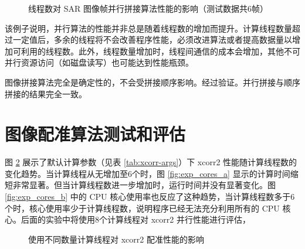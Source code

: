 \begin{figure}[htbp]
\centering
\subfloat[程序计算时间]{
    \label{fig:exp_merge_a}
    \begin{minipage}[t]{0.49\textwidth}
        \centering
        \resizebox {\textwidth} {!} {
            
        }
    \end{minipage}
}
\caption{线程数对 SAR 图像帧并行拼接算法性能的影响（测试数据共6帧）} \label{fig:exp_merge}
\end{figure}
 
该例子说明，并行算法的性能并非总是随着线程数的增加而提升。计算线程数量超过一定值后，多余的线程将不会改善程序性能，必须改进算法或者提高数据量以增加可利用的线程数。此外，线程数量增加时，线程间通信的成本会增加，其他不可并行资源访问（如磁盘读写）也可能达到性能瓶颈。

图像拼接算法完全是确定性的，不会受拼接顺序影响。经过验证。并行拼接与顺序拼接的结果完全一致。

\section{图像配准算法测试和评估}

图 \ref{fig:exp_cores} 展示了默认计算参数（见表 \ref{tab:xcorr-args}）下 xcorr2 性能随计算线程数的变化趋势。当计算线程从无增加至6个时，图 \ref{fig:exp_cores_a} 显示的计算时间缩短非常显著。但当计算线程数进一步增加时，运行时间并没有显著变化。图 \ref{fig:exp_cores_b} 中的 CPU 核心使用率也反应了这种趋势，当计算线程数多于6个时，核心使用率少于计算线程数，说明程序已经无法充分利用所有的 CPU 核心。后面的实验中将使用8个计算线程对 xcorr2 并行性能进行评估，

\begin{figure}[htbp]
\centering
\subfloat[程序计算时间]{
    \label{fig:exp_cores_a}
    \begin{minipage}[t]{0.49\textwidth}
        \centering
        \resizebox {\textwidth} {!} {
            
        }
    \end{minipage}
}
\caption{使用不同数量计算线程对 xcorr2 配准性能的影响}
\label{fig:exp_cores}
\end{figure}

